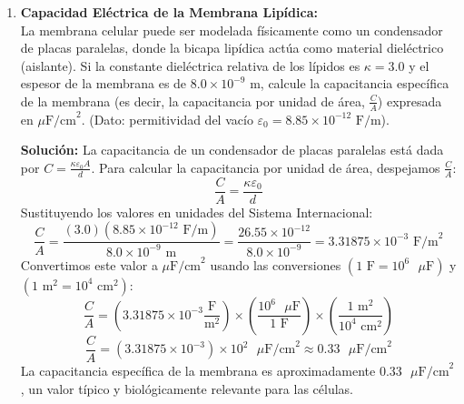 \documentclass[11pt,letterpaper]{article}
\begin{document}
\begin{enumerate}[leftmargin=*]
    \textbf{Solución:}
    Para un campo eléctrico uniforme, la relación entre el campo eléctrico ($E$), la diferencia de potencial ($\Delta V$) y la distancia ($d$) viene dada por:
    \[
    E = \frac{|\Delta V|}{d}
    \]
    Sustituyendo la diferencia de potencial transmembrana y el espesor de la membrana:
    \[
    E = \frac{|-0.070 \text{ V} - 0 \text{ V}|}{8.0 \times 10^{-9} \text{ m}} = \frac{0.070}{8.0 \times 10^{-9}}
    \]
    \[
    E = 8.75 \times 10^6 \text{ V/m}
    \]
    El campo eléctrico tiene una enorme intensidad de $8.75 \text{ millones de V/m}$, lo cual es posible sin generar una ruptura dieléctrica debido a que está confinado en un espacio nanométrico.

    \vspace{0.3cm}

    \item \textbf{Capacidad Eléctrica de la Membrana Lipídica:}\\
    La membrana celular puede ser modelada físicamente como un condensador de placas paralelas, donde la bicapa lipídica actúa como material dieléctrico (aislante). Si la constante dieléctrica relativa de los lípidos es $\kappa = 3.0$ y el espesor de la membrana es de $8.0 \times 10^{-9} \text{ m}$, calcule la capacitancia específica de la membrana (es decir, la capacitancia por unidad de área, $\frac{C}{A}$) expresada en $\mu\text{F/cm}^2$. (Dato: permitividad del vacío $\varepsilon_0 = 8.85 \times 10^{-12} \text{ F/m}$).
    
    \textbf{Solución:}
    La capacitancia de un condensador de placas paralelas está dada por $C = \frac{\kappa \varepsilon_0 A}{d}$.
    Para calcular la capacitancia por unidad de área, despejamos $\frac{C}{A}$:
    \[
    \frac{C}{A} = \frac{\kappa \varepsilon_0}{d}
    \]
    Sustituyendo los valores en unidades del Sistema Internacional:
    \[
    \frac{C}{A} = \frac{(3.0)(8.85 \times 10^{-12} \text{ F/m})}{8.0 \times 10^{-9} \text{ m}} = \frac{26.55 \times 10^{-12}}{8.0 \times 10^{-9}} = 3.31875 \times 10^{-3} \text{ F/m}^2
    \]
    Convertimos este valor a $\mu\text{F/cm}^2$ usando las conversiones $(1 \text{ F} = 10^6 \text{ }\mu\text{F})$ y $(1 \text{ m}^2 = 10^4 \text{ cm}^2)$:
    \[
    \frac{C}{A} = \left( 3.31875 \times 10^{-3} \frac{\text{F}}{\text{m}^2} \right) \times \left( \frac{10^6 \text{ }\mu\text{F}}{1 \text{ F}} \right) \times \left( \frac{1 \text{ m}^2}{10^4 \text{ cm}^2} \right)
    \]
    \[
    \frac{C}{A} = (3.31875 \times 10^{-3}) \times 10^2 \text{ }\mu\text{F/cm}^2 \approx 0.33 \text{ }\mu\text{F/cm}^2
    \]
    La capacitancia específica de la membrana es aproximadamente $0.33 \text{ }\mu\text{F/cm}^2$, un valor típico y biológicamente relevante para las células.


\end{enumerate}
\end{document}
